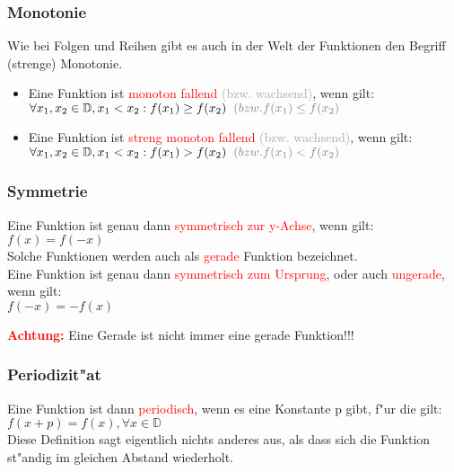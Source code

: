 \subsubsection{Monotonie}
Wie bei Folgen und Reihen gibt es auch in der Welt der Funktionen den Begriff (strenge) Monotonie.\\
\begin{itemize}
\item Eine Funktion ist \textcolor{red}{monoton fallend} \textcolor{DarkGrey}{(bzw. wachsend)}, wenn gilt:\\
$\forall x_1, x_2 \in\mathbb{D}, x_1 < x_2: f(x_1)\geq f(x_2) \hspace{0.2 cm}\textcolor{DarkGrey}{(bzw. f(x_1)\leq f(x_2)}$
\item Eine Funktion ist \textcolor{red}{streng monoton fallend} \textcolor{DarkGrey}{(bzw. wachsend)}, wenn gilt:\\
$\forall x_1, x_2 \in\mathbb{D}, x_1 < x_2: f(x_1)>f(x_2) \hspace{0.2 cm}\textcolor{DarkGrey}{(bzw. f(x_1)<f(x_2)}$
\end{itemize}

\subsubsection{Symmetrie}
\begin{flushleft}
Eine Funktion ist genau dann \textcolor{red}{symmetrisch zur y-Achse}, wenn gilt:\\
$f(x)=f(-x)$\\
Solche Funktionen werden auch als \textcolor{red}{gerade} Funktion bezeichnet.\\\vspace{0.5 cm}
Eine Funktion ist genau dann \textcolor{red}{symmetrisch zum Ursprung}, oder auch \textcolor{red}{ungerade}, wenn gilt:\\
$f(-x)=-f(x)$\\
\end{flushleft}
\textbf{\textcolor{red}{Achtung:}} Eine Gerade ist nicht immer eine gerade Funktion!!!

\subsubsection{Periodizit"at}
Eine Funktion ist dann \textcolor{red}{periodisch}, wenn es eine Konstante p gibt, f"ur die gilt:\\
$f(x+p) = f(x), \forall x\in\mathbb{D}$\vspace{0.5 cm}\\
Diese Definition sagt eigentlich nichts anderes aus, als dass sich die Funktion st"andig im gleichen Abstand wiederholt.

